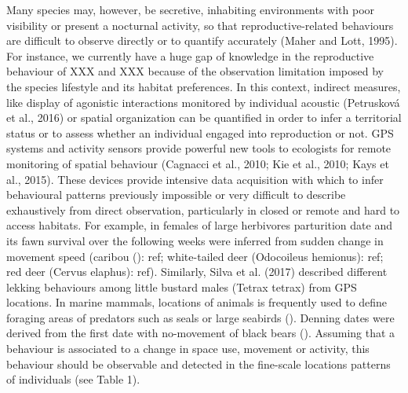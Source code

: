 \documentclass[a4paper,11pt]{article}
\newcommand{\species}[1]{(\xmakefirstuc{\emph{#1}})}
\begin{document}
Many species may, however, be secretive, inhabiting environments with
poor visibility or present a nocturnal activity, so that
reproductive-related behaviours are difficult to observe directly or
to quantify accurately (Maher and Lott, 1995). For instance, we
currently have a huge gap of knowledge in the reproductive behaviour
of XXX and XXX because of the observation limitation imposed by the
species lifestyle and its habitat preferences. In this context,
indirect measures, like display of agonistic interactions monitored by
individual acoustic (Petrusková et al., 2016) or spatial organization
can be quantified in order to infer a territorial status
\citep{wronski_home-range_2005,corlatti_hormones_2012} or to assess
whether an individual engaged into reproduction or not. GPS systems
and activity sensors provide powerful new tools to ecologists for
remote monitoring of spatial behaviour (Cagnacci et al., 2010; Kie et
al., 2010; Kays et al., 2015). These devices provide intensive data
acquisition with which to infer behavioural patterns previously
impossible or very difficult to describe exhaustively from direct
observation, particularly in closed or remote and hard to access
habitats. For example, in females of large herbivores parturition date
and its fawn survival over the following weeks were inferred from
sudden change in movement speed (caribou \species{Rangifer tanrandus}:
ref; white-tailed deer (Odocoileus hemionus): ref; red deer (Cervus
elaphus): ref). Similarly, Silva et al. (2017) described different
lekking behaviours among little bustard males (Tetrax tetrax) from GPS
locations. In marine mammals, locations of animals is frequently used
to define foraging areas of predators such as seals or large seabirds
(). Denning dates were derived from the first date with no-movement of
black bears (). Assuming that a behaviour is associated to a change in
space use, movement or activity, this behaviour should be observable
and detected in the fine-scale locations patterns of individuals (see
Table 1).
\end{document}
